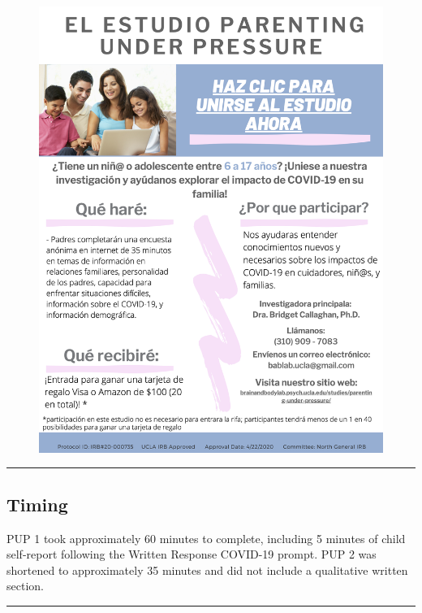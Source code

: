 \documentclass[]{book}
\begin{document}
\begin{figure}
\centering
\includegraphics{images/PUP_spanish_flyer.png}
\caption{}
\end{figure}

\begin{center}\rule{0.5\linewidth}{0.5pt}\end{center}

\hypertarget{timing}{%
\subsection{Timing}\label{timing}}

PUP 1 took approximately 60 minutes to complete, including 5 minutes of child self-report following the Written Response COVID-19 prompt. PUP 2 was shortened to approximately 35 minutes and did not include a qualitative written section.

\begin{center}\rule{0.5\linewidth}{0.5pt}\end{center}
\end{document}
